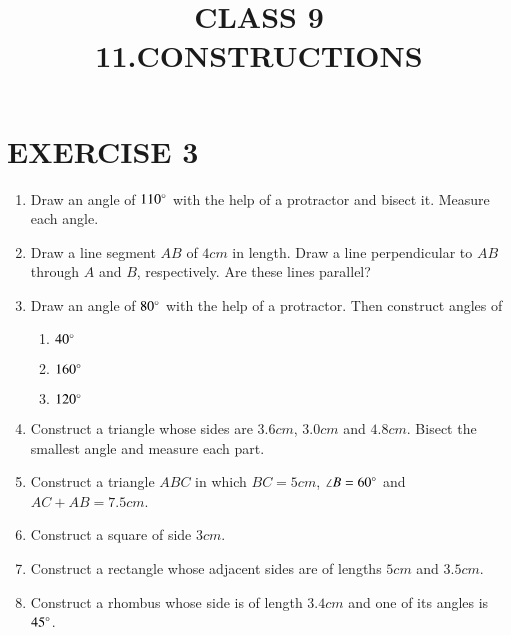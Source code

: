 \documentclass{article}
\begin{document}
\title{CLASS 9\\11.CONSTRUCTIONS}
\date{}
\maketitle
\section{EXERCISE 3}
\begin{enumerate}
\item Draw an angle of $110\degree$ with the help of a protractor and bisect it. Measure each angle.
\item Draw a line segment $AB$ of $4 cm$ in length. Draw a line perpendicular to $AB$ through $A$ and $B$, respectively. Are these lines parallel?
\item Draw an angle of $80\degree$ with the help of a protractor. Then construct angles of
\begin{enumerate}
\item $40\degree$
\item $160\degree$
\item $120\degree$
\end{enumerate}
\item Construct a triangle whose sides are $3.6 cm$, $3.0 cm$ and $4.8 cm$. Bisect the smallest angle and measure each part.
\item Construct a triangle $ABC$ in which $BC = 5 cm$, $\angle B = 60\degree$ and $AC+AB = 7.5cm$.
\item Construct a square of side $3 cm$.
\item Construct  a rectangle whose adjacent sides are of lengths $5 cm$ and $3.5 cm$.
\item Construct a rhombus whose side is of length $3.4 cm$ and one of its angles is $45\degree$.
\end{enumerate}
\end{document}
